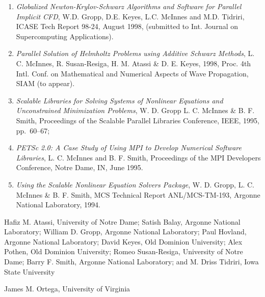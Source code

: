 
\itemskip
{}
\begin{enumerate}
\item
{\it Globalized Newton-Krylov-Schwarz Algorithms and Software for
Parallel Implicit CFD}, W.D. Gropp, D.E. Keyes, L.C. McInnes and
M.D. Tidriri, ICASE Tech Report 98-24, August 1998, (submitted to
Int. Journal on Supercomputing Applications).
\item
{\it Parallel Solution of Helmholtz Problems using Additive Schwarz Methods}, 
L. C. McInnes, R. Susan-Resiga, H. M. Atassi \& D. E. Keyes, 1998, 
Proc. 4th Intl. Conf. on Mathematical and Numerical
Aspects of Wave Propagation, SIAM (to appear). 
\item
{\it Scalable Libraries for Solving Systems of Nonlinear Equations and
Unconstrained Minimization Problems}, W. D. Gropp L. C. McInnes \& B. F. Smith, 
Proceedings of the Scalable Parallel Libraries Conference, IEEE, 1995, pp.~60--67;
\item
{\it PETSc 2.0: A Case Study of Using MPI to Develop Numerical Software 
Libraries}, L. C. McInnes and  B. F. Smith, Proceedings of the MPI Developers Conference, Notre Dame, 
IN, June 1995.
\item
{\it Using the Scalable Nonlinear Equation Solvers Package}, W. D. Gropp, L. C. McInnes \& B. F. Smith,
MCS Technical Report ANL/MCS-TM-193, Argonne National Laboratory, 1994.

\end{enumerate}

\itemskip
{}
\begin{description}
\item
Hafiz M. Atassi, University of Notre Dame;
Satish Balay, Argonne National Laboratory;
William D. Gropp, Argonne National Laboratory;
Paul Hovland, Argonne National Laboratory;
David Keyes, Old Dominion University;
Alex Pothen, Old Dominion University;
Romeo Susan-Resiga, University of Notre Dame;
Barry F. Smith, Argonne National Laboratory; and
M. Driss Tidriri, Iowa State University
\end{description}

\itemskip
{} 
\begin{description}
\item
James M. Ortega, University of Virginia
\end{description}



